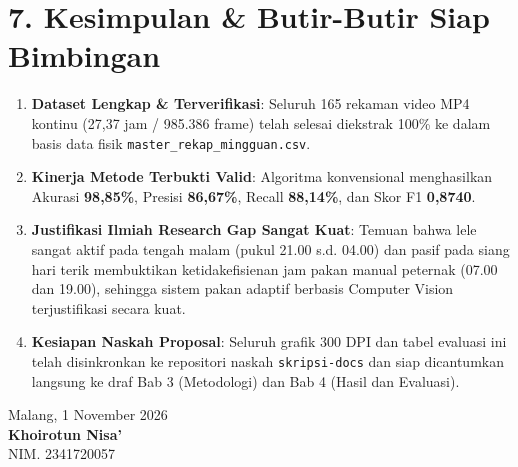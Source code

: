 \documentclass[10pt,a4paper]{article}
\begin{document}
\section*{7. Kesimpulan \& Butir-Butir Siap Bimbingan}

\begin{enumerate}
  \item \textbf{Dataset Lengkap \& Terverifikasi}: Seluruh 165 rekaman video MP4 kontinu (27,37 jam / 985.386 frame) telah selesai diekstrak 100\% ke dalam basis data fisik \texttt{master\_rekap\_mingguan.csv}.
  \item \textbf{Kinerja Metode Terbukti Valid}: Algoritma konvensional menghasilkan Akurasi \textbf{98,85\%}, Presisi \textbf{86,67\%}, Recall \textbf{88,14\%}, dan Skor F1 \textbf{0,8740}.
  \item \textbf{Justifikasi Ilmiah Research Gap Sangat Kuat}: Temuan bahwa lele sangat aktif pada tengah malam (pukul 21.00 s.d. 04.00) dan pasif pada siang hari terik membuktikan ketidakefisienan jam pakan manual peternak (07.00 dan 19.00), sehingga sistem pakan adaptif berbasis Computer Vision terjustifikasi secara kuat.
  \item \textbf{Kesiapan Naskah Proposal}: Seluruh grafik 300 DPI dan tabel evaluasi ini telah disinkronkan ke repositori naskah \texttt{skripsi-docs} dan siap dicantumkan langsung ke draf Bab 3 (Metodologi) dan Bab 4 (Hasil dan Evaluasi).
\end{enumerate}

\vspace{10pt}
\begin{flushright}
  Malang, 1 November 2026\\[18pt]
  \textbf{Khoirotun Nisa'}\\
  NIM. 2341720057
\end{flushright}
\end{document}
